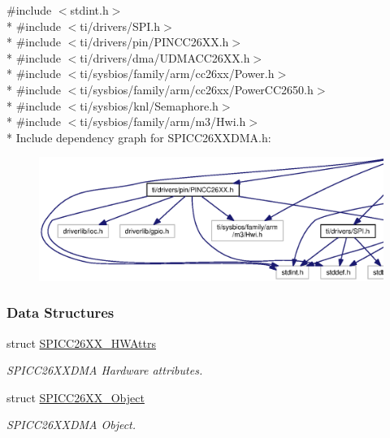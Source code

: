 {\ttfamily \#include $<$stdint.\+h$>$}\\*
{\ttfamily \#include $<$ti/drivers/\+S\+P\+I.\+h$>$}\\*
{\ttfamily \#include $<$ti/drivers/pin/\+P\+I\+N\+C\+C26\+X\+X.\+h$>$}\\*
{\ttfamily \#include $<$ti/drivers/dma/\+U\+D\+M\+A\+C\+C26\+X\+X.\+h$>$}\\*
{\ttfamily \#include $<$ti/sysbios/family/arm/cc26xx/\+Power.\+h$>$}\\*
{\ttfamily \#include $<$ti/sysbios/family/arm/cc26xx/\+Power\+C\+C2650.\+h$>$}\\*
{\ttfamily \#include $<$ti/sysbios/knl/\+Semaphore.\+h$>$}\\*
{\ttfamily \#include $<$ti/sysbios/family/arm/m3/\+Hwi.\+h$>$}\\*
Include dependency graph for S\+P\+I\+C\+C26\+X\+X\+D\+M\+A.\+h\+:
\nopagebreak
\begin{figure}[H]
\begin{center}
\leavevmode
\includegraphics[width=350pt]{_s_p_i_c_c26_x_x_d_m_a_8h__incl}
\end{center}
\end{figure}
\subsubsection*{Data Structures}
\begin{DoxyCompactItemize}
\item 
struct \hyperlink{struct_s_p_i_c_c26_x_x___h_w_attrs}{S\+P\+I\+C\+C26\+X\+X\+\_\+\+H\+W\+Attrs}
\begin{DoxyCompactList}\small\item\em S\+P\+I\+C\+C26\+X\+X\+D\+M\+A Hardware attributes. \end{DoxyCompactList}\item 
struct \hyperlink{struct_s_p_i_c_c26_x_x___object}{S\+P\+I\+C\+C26\+X\+X\+\_\+\+Object}
\begin{DoxyCompactList}\small\item\em S\+P\+I\+C\+C26\+X\+X\+D\+M\+A Object. \end{DoxyCompactList}\end{DoxyCompactItemize}

